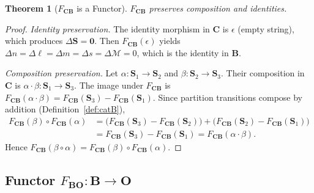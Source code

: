 \documentclass[twocolumn,10pt]{article}
\newtheorem{theorem}{Theorem}[section]
\theoremstyle{remark}
\newcommand{\Depth}{\mathcal{M}}
\newcommand{\Scoord}{\mathbf{S}}
\newcommand{\CatO}{\mathbf{O}}
\newcommand{\CatC}{\mathbf{C}}
\newcommand{\CatB}{\mathbf{B}}
\newcommand{\Fcb}{F_{\CatC\CatB}}
\newcommand{\Fbo}{F_{\CatB\CatO}}
\begin{document}
\begin{theorem}[$\Fcb$ is a Functor]
\label{thm:Fcb_functor}
$\Fcb$ preserves composition and identities.
\end{theorem}

\begin{proof}
\textit{Identity preservation.}
The identity morphism in $\CatC$ is $\epsilon$ (empty string), which produces $\Delta\Scoord = \mathbf{0}$.
Then $\Fcb(\epsilon)$ yields $\Delta n = \Delta\ell = \Delta m = \Delta s = \Delta\Depth = 0$, which is the identity in $\CatB$.

\textit{Composition preservation.}
Let $\alpha: \Scoord_1 \to \Scoord_2$ and $\beta: \Scoord_2 \to \Scoord_3$.
Their composition in $\CatC$ is $\alpha \cdot \beta: \Scoord_1 \to \Scoord_3$.
The image under $\Fcb$ is $\Fcb(\alpha \cdot \beta) = \Fcb(\Scoord_3) - \Fcb(\Scoord_1)$.
Since partition transitions compose by addition (Definition~\ref{def:catB}),
\begin{align}
\Fcb(\beta) \circ \Fcb(\alpha) &= \bigl(\Fcb(\Scoord_3) - \Fcb(\Scoord_2)\bigr) + \bigl(\Fcb(\Scoord_2) - \Fcb(\Scoord_1)\bigr) \nonumber\\
&= \Fcb(\Scoord_3) - \Fcb(\Scoord_1) = \Fcb(\alpha \cdot \beta).
\end{align}
Hence $\Fcb(\beta \circ \alpha) = \Fcb(\beta) \circ \Fcb(\alpha)$.
\end{proof}

\subsection{Functor $\Fbo: \CatB \to \CatO$}
\end{document}
